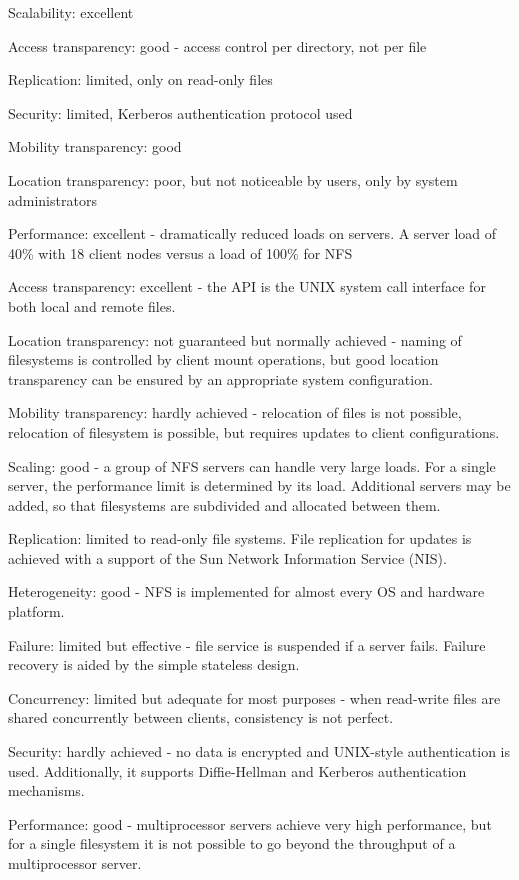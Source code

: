 
 Scalability: excellent

 Access transparency: good - access control per directory, not per
file

 Replication: limited, only on read-only files

 Security: limited, Kerberos authentication protocol used

 Mobility transparency: good

 Location transparency: poor, but not noticeable by users, only by
system administrators

Performance: excellent - dramatically reduced loads on servers. A
server load of 40\% with 18 client nodes versus a load of 100\% for
NFS

Access transparency: excellent - the API is the UNIX system call
interface for both local and remote files.

Location transparency: not guaranteed but normally achieved -
naming of filesystems is controlled by client mount operations, but
good location transparency can be ensured by an appropriate
system configuration.

 Mobility transparency: hardly achieved - relocation of files is not
possible, relocation of filesystem is possible, but requires updates
to client configurations.

 Scaling: good - a group of NFS servers can handle very large loads.
For a single server, the performance limit is determined by its load.
Additional servers may be added, so that filesystems are
subdivided and allocated between them.

 Replication: limited to read-only file systems. File replication for
updates is achieved with a support of the Sun Network
Information Service (NIS).

 Heterogeneity: good - NFS is implemented for almost every OS
and hardware platform.

 Failure: limited but effective - file service is suspended if a server
fails. Failure recovery is aided by the simple stateless design.

 Concurrency: limited but adequate for most purposes - when
read-write files are shared concurrently between clients,
consistency is not perfect.

 Security: hardly achieved - no data is encrypted and UNIX-style
authentication is used. Additionally, it supports Diffie-Hellman
and Kerberos authentication mechanisms.

 Performance: good - multiprocessor servers achieve very high
performance, but for a single filesystem it is not possible to go
beyond the throughput of a multiprocessor server.